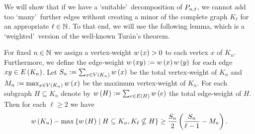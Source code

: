 We will show that if we have a \lq suitable\rq\ decomposition of $P_{n,t}$, we cannot add too \lq many\rq\ further edges without creating a minor of the complete graph $K_\ell$ for an appropriate $\ell\in\mathbb{N}$. To that end, we will use the following lemma, which is a \lq weighted\rq\ version of the well-known Tur{\'a}n's theorem.
\begin{lem}\label{PPlem:weighted_turan}
For fixed $n\in\mathbb{N}$ we assign a vertex-weight $w\left(x\right)>0$ to each vertex $x$ of $K_n$. Furthermore, we define the edge-weight $w\left(xy\right):=w\left(x\right)w\left(y\right)$ for each edge $xy\in E\left(K_n\right)$. Let $S_n:=\sum_{x\in V\left(K_n\right)}w\left(x\right)$ be the total vertex-weight of $K_n$ and $M_n:=\max_{x\in V\left(K_n\right)}w\left(x\right)$ be the maximum vertex-weight of $K_n$. For each subgraph $H\subseteq K_n$ denote by $w\left(H\right):=\sum_{e\in E\left(H\right)}w\left(e\right)$ the total edge-weight of $H$. Then for each $\ell\geq 2$ we have 
\begin{align*}
w\left(K_n\right)-\max\left\{w\left(H\right) \mid H\subseteq K_n, K_\ell\nsubseteq H\right\}\geq \frac{S_n}{2}\left(\frac{S_n}{\ell-1}-M_n\right).
\end{align*}
\end{lem}
